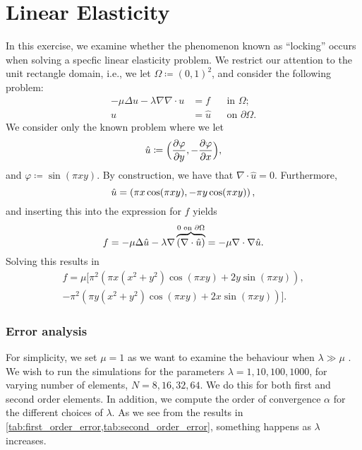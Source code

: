 \documentclass[twocolumn, article]{memoir}
\begin{document}
\chapter*{Linear Elasticity}
\label{cha:linear_elasticity}

In this exercise, we examine whether the phenomenon known as ``locking'' occurs
when solving a specfic linear elasticity problem. We restrict our attention to
the unit rectangle domain, i.e., we let \( \Omega \coloneqq (0, 1)^2\), and
consider the following problem:
\begin{align*}
    - \mu \Delta u - \lambda\nabla\nabla \cdot u &= f & & \text{in } \Omega; \\
    u &= \hat{u}& & \text{on } \partial\Omega.
\end{align*}
We consider only the known problem where we let 
\begin{equation}
    \notag
    \hat{u}\coloneqq \Big( \frac{\partial \varphi}{\partial y}, -\frac{\partial
    \varphi}{\partial x} \Big), 
\end{equation}
and \( \varphi \coloneqq \sin(\pi x y) \). By construction, we have that
\(\nabla \cdot \hat{u}= 0 \). Furthermore, 
\begin{equation}
    \notag
    \hat{u} = \left( \pi x \cos(\pi x y), -\pi y\cos(\pi x y) \right),
\end{equation}
and inserting this into the expression for \( f \) yields
\begin{equation}
    \notag
    f = -\mu \Delta \hat{u} - \lambda \nabla \overbrace{(\nabla \cdot
    \hat{u})}^{0 \text{ on } \partial\Omega} = -\mu \nabla \cdot \nabla
    \hat{u}. 
\end{equation}
Solving this results in 
\begin{align*}
    f = \mu \Big[ \pi^2\left(\pi x ( x^2 + y^2)\cos(\pi x y) + 2 y \sin(\pi x y)\right), \\
        -\pi^2 \left(\pi y (x^2 + y^2) \cos(\pi x y) + 2 x \sin( \pi x y)\right) \Big].
\end{align*}

\subsection*{Error analysis}

For simplicity, we set \( \mu = 1 \) as we want to examine the behaviour when
\(\lambda \gg \mu\) .  We wish to run the simulations for the parameters \(
\lambda = 1, 10, 100, 1000 \), for varying number of elements, \( N = 8, 16,
32, 64 \). We do this for both first and second order elements. In addition, we
compute the order of convergence \( \alpha \) for the different choices of \(
\lambda \). As we see from the results in
\cref{tab:first_order_error,tab:second_order_error}, something happens as
\(\lambda\) increases.
\end{document}
